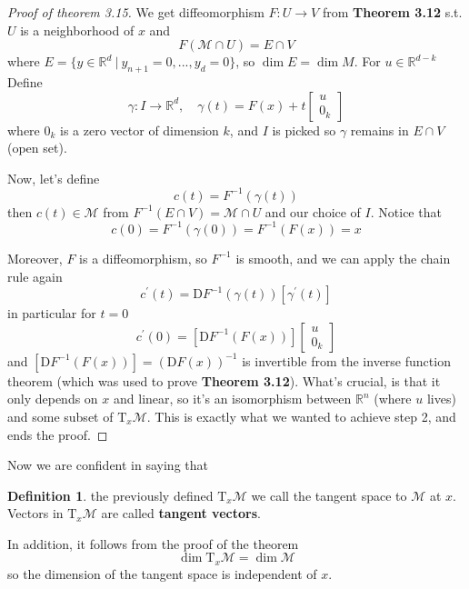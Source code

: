 \documentclass[12pt]{article}
\newcommand*{\T}{\mathrm{T}}
\newcommand*{\D}{\mathrm{D}}
\theoremstyle{definition}
\newtheorem{definition}{Definition}[section]
\begin{document}
\begin{proof}[Proof of theorem 3.15]
We get diffeomorphism $F: U \to V$ from \textbf{Theorem 3.12} s.t. $U$ is a neighborhood of $x$ and 
\begin{equation}
    F(\mathcal{M} \cap U) = E \cap V 
\end{equation}
where $E = \{y \in \mathbb{R}^d \ | \ y_{n+1} = 0, ..., y_{d} = 0\}$, so $\dim E = \dim M$. For $u \in \mathbb{R}^{d-k}$ Define 
\begin{equation}
    \gamma: I \to \mathbb{R}^{d}, \quad \gamma(t) = F(x) + t \begin{bmatrix}
        u \\
        0_k 
    \end{bmatrix} 
\end{equation}
where $0_k$ is a zero vector of dimension $k$, and $I$ is picked so $\gamma$ remains in $E \cap V$ (open set). 

Now, let's define 
\begin{equation}
    c(t) = F^{-1}(\gamma(t))
\end{equation}
then $c(t) \in \mathcal{M}$ from $F^{-1}(E \cap V) = \mathcal{M} \cap U$ and our choice of $I$. Notice that 
\begin{equation}
    c(0) = F^{-1}(\gamma(0)) = F^{-1}(F(x)) = x
\end{equation}

Moreover, $F$ is a diffeomorphism, so $F^{-1}$ is smooth, and we can apply the chain rule again 
\begin{equation}
    c^\prime (t) = \D F^{-1}(\gamma(t))[\gamma^\prime (t)]
\end{equation}
in particular for $t = 0$ 
\begin{equation}
    c^\prime (0) =  [\D F^{-1}(F(x))] \begin{bmatrix}
        u \\
        0_k 
    \end{bmatrix} 
\end{equation}
and $[\D F^{-1}(F(x))] = (\D F(x))^{-1}$ is invertible from the inverse function theorem (which was used to prove \textbf{Theorem 3.12}). What's crucial, is that it only depends on $x$ and linear, so it's an isomorphism between $\mathbb{R}^{n}$ (where $u$ lives) and some subset of $\T_x \mathcal{M}$. This is exactly what we wanted to achieve step 2, and ends the proof. 

\end{proof}

Now we are confident in saying that 
\begin{definition}
    the previously defined $\T_x \mathcal{M}$ we call the tangent space to $\mathcal{M}$ at $x$. Vectors in $\T_x \mathcal{M}$ are called \textbf{tangent vectors}.
\end{definition}
In addition, it follows from the proof of the theorem 
\begin{equation}
    \dim \T_x \mathcal{M} = \dim \mathcal{M}
\end{equation} 
so the dimension of the tangent space is independent of $x$.
\end{document}
